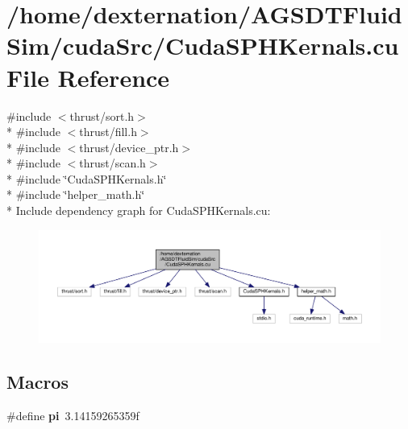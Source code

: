 \hypertarget{_cuda_s_p_h_kernals_8cu}{\section{/home/dexternation/\-A\-G\-S\-D\-T\-Fluid\-Sim/cuda\-Src/\-Cuda\-S\-P\-H\-Kernals.cu File Reference}
\label{_cuda_s_p_h_kernals_8cu}
}
{\ttfamily \#include $<$thrust/sort.\-h$>$}\\*
{\ttfamily \#include $<$thrust/fill.\-h$>$}\\*
{\ttfamily \#include $<$thrust/device\-\_\-ptr.\-h$>$}\\*
{\ttfamily \#include $<$thrust/scan.\-h$>$}\\*
{\ttfamily \#include \char`\"{}Cuda\-S\-P\-H\-Kernals.\-h\char`\"{}}\\*
{\ttfamily \#include \char`\"{}helper\-\_\-math.\-h\char`\"{}}\\*
Include dependency graph for Cuda\-S\-P\-H\-Kernals.\-cu\-:\nopagebreak
\begin{figure}[H]
\begin{center}
\leavevmode
\includegraphics[width=350pt]{_cuda_s_p_h_kernals_8cu__incl}
\end{center}
\end{figure}
\subsection*{Macros}
\begin{DoxyCompactItemize}
\item 
\hypertarget{_cuda_s_p_h_kernals_8cu_a1daf785e3f68d293c7caa1c756d5cb74}{\#define {\bfseries pi}~3.\-14159265359f}\label{_cuda_s_p_h_kernals_8cu_a1daf785e3f68d293c7caa1c756d5cb74}

\end{DoxyCompactItemize}

